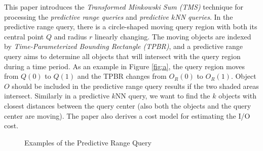 \documentclass[paper=a4, fontsize=18pt]{article} %
\numberwithin{equation}{section} %
\numberwithin{figure}{section} %
\numberwithin{table}{section} %
\begin{document}
This paper introduces the \emph{Transformed Minkowski Sum (TMS)} technique for processing the \emph{predictive range queries} and \emph{predictive $k$NN queries}. In the predictive range query, there is a circle-shaped moving query region with both its central point $Q$ and radius $r$ linearly changing. The moving objects are indexed by \emph{Time-Parameterized Bounding Rectangle (TPBR)}, and a predictive range query aims to determine all objects that will intersect with the query region during a time period. As an example in Figure \ref{fig:a}, the query region moves from $Q(0)$ to $Q(1)$ and the TPBR changes from $O_R(0)$ to $O_R(1)$. Object $O$ should be included in the predictive range query results if the two shaded areas intersect. Similarly in a predictive $k$NN query, we want to find the $k$ objects with closest distances between the query center (also both the objects and the query center are moving). The paper also derives a cost model for estimating the I/O cost.

\begin{figure}[h]
  \centering
  \caption{Examples of the Predictive Range Query}
\end{figure}
\end{document}

